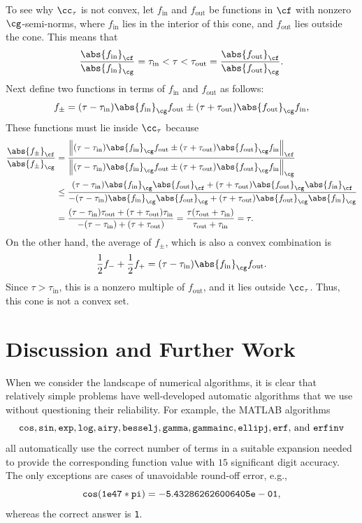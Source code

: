 \documentclass[]{elsarticle}
\theoremstyle{definition}
\theoremstyle{remark}
\newcommand{\Fnorm}[1]{\abs{#1}_{\cf}}
\newcommand{\Gnorm}[1]{\abs{#1}_{\cg}}
\begin{document}
To see why $\cc_{\tau}$ is not convex, let $f_{\text{in}}$ and $f_{\text{out}}$ be functions in $\cf$ with nonzero $\cg$-semi-norms, where $f_{\text{in}}$  lies in the interior of this cone, and $f_{\text{out}}$ lies outside the cone.  This means that 
\[
\frac{\Fnorm{f_{\text{in}}}} {\Gnorm{f_{\text{in}}}} = \tau_{\text{in}} < \tau < \tau_{\text{out}} =  \frac{\Fnorm{f_{\text{out}}}} {\Gnorm{f_{\text{out}}}}.
\]
Next define two functions in terms of $f_{\text{in}}$ and $f_{\text{out}}$ as follows:
\[
f_{\pm} = (\tau-\tau_{\text{in}}) \Gnorm{f_{\text{in}}} f_{\text{out}}  \pm (\tau + \tau_{\text{out}}) \Gnorm{f_{\text{out}}} f_{\text{in}},
\]
These functions must lie inside  $\cc_{\tau}$ because
\begin{align*}
\frac{\Fnorm{f_{\pm}}} {\Gnorm{f_{\pm}}} 
&= \frac{\Bigl \lVert (\tau-\tau_{\text{in}}) \Gnorm{f_{\text{in}}} f_{\text{out}}  \pm (\tau + \tau_{\text{out}}) \Gnorm{f_{\text{out}}} f_{\text{in}}\Bigr \rVert_{\cf}}
{\Bigl \lVert (\tau-\tau_{\text{in}}) \Gnorm{f_{\text{in}}} f_{\text{out}}  \pm (\tau + \tau_{\text{out}}) \Gnorm{f_{\text{out}}} f_{\text{in}}\Bigr \rVert_{\cg}}\\
& \le 
\frac{(\tau-\tau_{\text{in}}) \Gnorm{f_{\text{in}}} \Fnorm{f_{\text{out}}}  + (\tau + \tau_{\text{out}}) \Gnorm{f_{\text{out}}} \Fnorm{f_{\text{in}}}}
{-(\tau-\tau_{\text{in}}) \Gnorm{f_{\text{in}}} \Gnorm{f_{\text{out}}}  + (\tau + \tau_{\text{out}}) \Gnorm{f_{\text{out}}} \Gnorm{f_{\text{in}}}}\\
& =
\frac{(\tau-\tau_{\text{in}})\tau_{\text{out}}  + (\tau + \tau_{\text{out}}) \tau_{\text{in}} } {-(\tau-\tau_{\text{in}}) + (\tau + \tau_{\text{out}})}
=
\frac{\tau (\tau_{\text{out}} +\tau_{\text{in}}) } {\tau_{\text{out}} + \tau_{\text{in}}} =  \tau.
\end{align*}
On the other hand, the average of $f_{\pm}$, which is also a convex combination is 
\[
\frac{1}{2} f_- + \frac{1}{2} f_+ = (\tau-\tau_{\text{in}}) \Gnorm{f_{\text{in}}} f_{\text{out}}.
\]
Since $\tau > \tau_{\text{in}}$, this is a nonzero multiple of $f_{\text{out}}$, and it lies outside $\cc_{\tau}$.  Thus, this cone is not a convex set.


\section{Discussion and Further Work} \label{furthersec}

When we consider the landscape of numerical algorithms, it is clear that relatively simple problems have well-developed automatic algorithms that we use without questioning their reliability.  For example, the MATLAB \cite{MAT7.12} algorithms
\[
{\tt cos, sin, exp, log, airy, besselj, gamma, gammainc, ellipj, erf,} \text{ and } {\tt  erfinv}
\] 
all automatically use the correct number of terms in a suitable expansion needed to provide the corresponding function value with $15$ significant digit accuracy. The only exceptions are cases of unavoidable round-off error, e.g., 
\[
{\tt cos(1e47*pi)= -5.432862626006405e-01},
\]
whereas the correct answer is {\tt 1}.  
\end{document}
